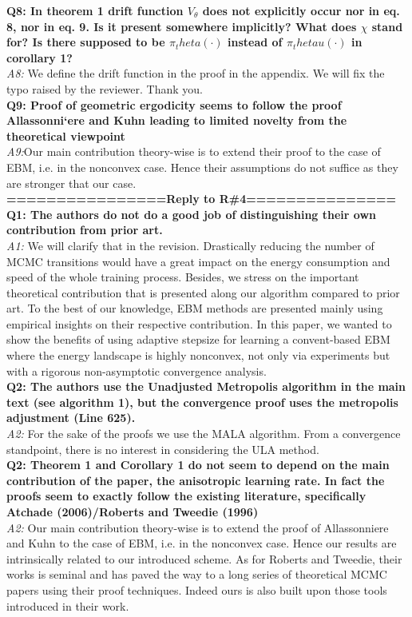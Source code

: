 \documentclass{article}
\begin{document}
\textbf{Q8: In theorem 1 drift function $V_\theta$ does not explicitly occur nor in eq. 8, nor in eq. 9. Is it present somewhere implicitly? What does $\chi$ stand for? Is there supposed to be $\pi_theta(\cdot)$ instead of $\pi_theta u(\cdot)$ in corollary 1?}\\
\textit{A8:} We define the drift function in the proof in the appendix. We will fix the typo raised by the reviewer. Thank you.\\

\textbf{Q9: Proof of geometric ergodicity seems to follow the proof Allassonni`ere and Kuhn leading to limited novelty from the theoretical viewpoint}\\
\textit{A9:}Our main contribution theory-wise is to extend their proof to the case of EBM, i.e. in the nonconvex case. Hence their assumptions do not suffice as they are stronger that our case.\\

\textbf{================Reply to R\#4===============}\\
\textbf{Q1: The authors do not do a good job of distinguishing their own contribution from prior art.}\\
\textit{A1: } We will clarify that in the revision.
Drastically reducing the number of MCMC transitions would have a great impact on the energy consumption and speed of the whole training process.
Besides, we stress on the important theoretical contribution that is presented along our algorithm compared to prior art. 
To the best of our knowledge, EBM methods are presented mainly using empirical insights on their respective contribution.
In this paper, we wanted to show the benefits of using adaptive stepsize for learning a convent-based EBM where the energy landscape is highly nonconvex, not only via experiments but with a rigorous non-asymptotic convergence analysis.\\

\textbf{Q2: The authors use the Unadjusted Metropolis algorithm in the main text (see algorithm 1), but the convergence proof uses the metropolis adjustment (Line 625).}\\
\textit{A2: } For the sake of the proofs we use the MALA algorithm. From a convergence standpoint, there is no interest in considering the ULA method.\\

\textbf{Q2: Theorem 1 and Corollary 1 do not seem to depend on the main contribution of the paper, the anisotropic learning rate. In fact the proofs seem to exactly follow the existing literature, specifically Atchade (2006)/Roberts and Tweedie (1996)}\\
\textit{A2: }Our main contribution theory-wise is to extend the proof of Allassonniere and Kuhn to the case of EBM, i.e. in the nonconvex case. Hence our results are intrinsically related to our introduced scheme. As for Roberts and Tweedie, their works is seminal and has paved the way to a long series of theoretical MCMC papers using their proof techniques. Indeed ours is also built upon those tools introduced in their work.\\
\end{document}
